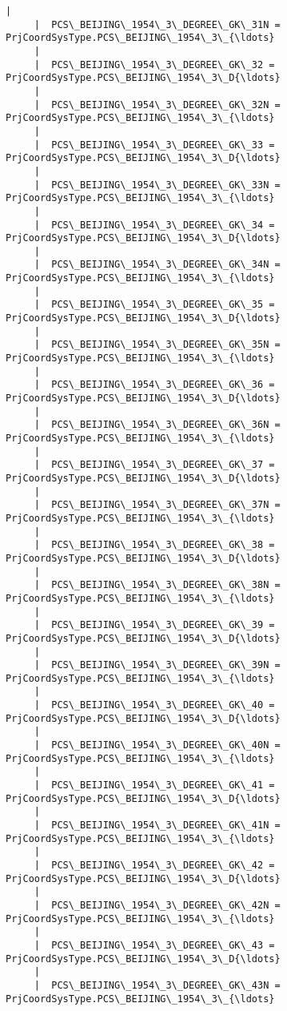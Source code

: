 \documentclass[11pt]{article}
\begin{document}
\begin{Verbatim}[commandchars=\\\{\}]
     |  
     |  PCS\_BEIJING\_1954\_3\_DEGREE\_GK\_31N = PrjCoordSysType.PCS\_BEIJING\_1954\_3\_{\ldots}
     |  
     |  PCS\_BEIJING\_1954\_3\_DEGREE\_GK\_32 = PrjCoordSysType.PCS\_BEIJING\_1954\_3\_D{\ldots}
     |  
     |  PCS\_BEIJING\_1954\_3\_DEGREE\_GK\_32N = PrjCoordSysType.PCS\_BEIJING\_1954\_3\_{\ldots}
     |  
     |  PCS\_BEIJING\_1954\_3\_DEGREE\_GK\_33 = PrjCoordSysType.PCS\_BEIJING\_1954\_3\_D{\ldots}
     |  
     |  PCS\_BEIJING\_1954\_3\_DEGREE\_GK\_33N = PrjCoordSysType.PCS\_BEIJING\_1954\_3\_{\ldots}
     |  
     |  PCS\_BEIJING\_1954\_3\_DEGREE\_GK\_34 = PrjCoordSysType.PCS\_BEIJING\_1954\_3\_D{\ldots}
     |  
     |  PCS\_BEIJING\_1954\_3\_DEGREE\_GK\_34N = PrjCoordSysType.PCS\_BEIJING\_1954\_3\_{\ldots}
     |  
     |  PCS\_BEIJING\_1954\_3\_DEGREE\_GK\_35 = PrjCoordSysType.PCS\_BEIJING\_1954\_3\_D{\ldots}
     |  
     |  PCS\_BEIJING\_1954\_3\_DEGREE\_GK\_35N = PrjCoordSysType.PCS\_BEIJING\_1954\_3\_{\ldots}
     |  
     |  PCS\_BEIJING\_1954\_3\_DEGREE\_GK\_36 = PrjCoordSysType.PCS\_BEIJING\_1954\_3\_D{\ldots}
     |  
     |  PCS\_BEIJING\_1954\_3\_DEGREE\_GK\_36N = PrjCoordSysType.PCS\_BEIJING\_1954\_3\_{\ldots}
     |  
     |  PCS\_BEIJING\_1954\_3\_DEGREE\_GK\_37 = PrjCoordSysType.PCS\_BEIJING\_1954\_3\_D{\ldots}
     |  
     |  PCS\_BEIJING\_1954\_3\_DEGREE\_GK\_37N = PrjCoordSysType.PCS\_BEIJING\_1954\_3\_{\ldots}
     |  
     |  PCS\_BEIJING\_1954\_3\_DEGREE\_GK\_38 = PrjCoordSysType.PCS\_BEIJING\_1954\_3\_D{\ldots}
     |  
     |  PCS\_BEIJING\_1954\_3\_DEGREE\_GK\_38N = PrjCoordSysType.PCS\_BEIJING\_1954\_3\_{\ldots}
     |  
     |  PCS\_BEIJING\_1954\_3\_DEGREE\_GK\_39 = PrjCoordSysType.PCS\_BEIJING\_1954\_3\_D{\ldots}
     |  
     |  PCS\_BEIJING\_1954\_3\_DEGREE\_GK\_39N = PrjCoordSysType.PCS\_BEIJING\_1954\_3\_{\ldots}
     |  
     |  PCS\_BEIJING\_1954\_3\_DEGREE\_GK\_40 = PrjCoordSysType.PCS\_BEIJING\_1954\_3\_D{\ldots}
     |  
     |  PCS\_BEIJING\_1954\_3\_DEGREE\_GK\_40N = PrjCoordSysType.PCS\_BEIJING\_1954\_3\_{\ldots}
     |  
     |  PCS\_BEIJING\_1954\_3\_DEGREE\_GK\_41 = PrjCoordSysType.PCS\_BEIJING\_1954\_3\_D{\ldots}
     |  
     |  PCS\_BEIJING\_1954\_3\_DEGREE\_GK\_41N = PrjCoordSysType.PCS\_BEIJING\_1954\_3\_{\ldots}
     |  
     |  PCS\_BEIJING\_1954\_3\_DEGREE\_GK\_42 = PrjCoordSysType.PCS\_BEIJING\_1954\_3\_D{\ldots}
     |  
     |  PCS\_BEIJING\_1954\_3\_DEGREE\_GK\_42N = PrjCoordSysType.PCS\_BEIJING\_1954\_3\_{\ldots}
     |  
     |  PCS\_BEIJING\_1954\_3\_DEGREE\_GK\_43 = PrjCoordSysType.PCS\_BEIJING\_1954\_3\_D{\ldots}
     |  
     |  PCS\_BEIJING\_1954\_3\_DEGREE\_GK\_43N = PrjCoordSysType.PCS\_BEIJING\_1954\_3\_{\ldots}

\end{Verbatim}
\end{document}
